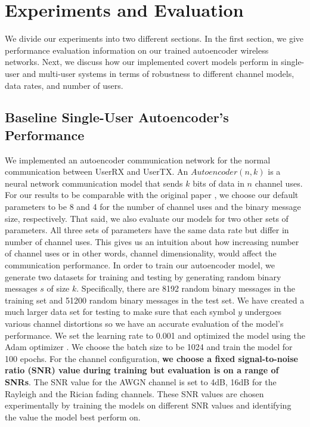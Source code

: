 \section{Experiments and Evaluation}
\label{s:eval}
We divide our experiments into two different sections. In the first section, we give performance evaluation information on our trained autoencoder wireless networks. Next, we discuss how our implemented covert models perform in single-user and multi-user systems in terms of robustness to different channel models, data rates, and number of users.

\subsection{Baseline Single-User Autoencoder's Performance}
We implemented an autoencoder communication network for the normal communication between UserRX and UserTX. An \(Autoencoder (n, k)\) is a neural network communication model that sends \(k\) bits of data in \(n\) channel uses. For our results to be comparable with the original paper \cite{o2017introduction}, we choose our default parameters to be 8 and 4 for the number of channel uses and the binary message size, respectively. That said, we also evaluate our models for two other sets of parameters. All three sets of parameters have the same data rate but differ in number of channel uses. This gives us an intuition about how increasing number of channel uses or in other words, channel dimensionality, would affect the communication performance. In order to train our autoencoder model, we generate two datasets for training and testing by generating random binary messages \(s\) of size \(k\). Specifically, there are 8192 random binary messages in the training set and 51200 random binary messages in the test set. We have created a much larger data set for testing to make sure that each symbol \(y\) undergoes various channel distortions so we have an accurate evaluation of the model's performance. We set the learning rate to 0.001 and optimized the model using the Adam optimizer \cite{kingma2014adam}. We choose the batch size to be 1024 and train the model for 100 epochs. For the channel configuration, \textbf{we choose a fixed signal-to-noise ratio (SNR) value during training but evaluation is on a range of SNRs}. The SNR value for the AWGN channel is set to 4dB, 16dB for the Rayleigh and the Rician fading channels. These SNR values are chosen experimentally by training the models on different SNR values and identifying the value the model best perform on.


